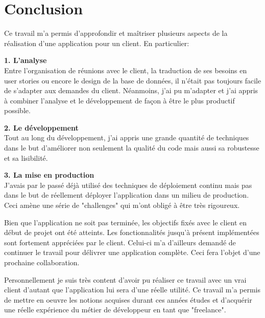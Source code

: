 \section{Conclusion}

Ce travail m'a permis d'approfondir et maîtriser plusieurs aspects de la réalisation d'une application pour un client. En particulier:

\vskip 0.5cm

\textbf{1. L'analyse} \\Entre l'organisation de réunions avec le client, la traduction de ses besoins en user stories ou encore le design de la base de données, il n'était pas toujours facile de s'adapter aux demandes du client. Néanmoins, j'ai pu m'adapter et j'ai appris à combiner l'analyse et le développement de façon à être le plus productif possible. 

\vskip 0.5cm
\textbf{2. Le développement} \\Tout au long du développement, j'ai appris une grande quantité de techniques dans le but d'améliorer non seulement la qualité du code mais aussi sa robustesse et sa lisibilité. 

\vskip 0.5cm
\textbf{3. La mise en production} \\J'avais par le passé déjà utilisé des techniques de déploiement continu mais pas dans le but de réellement déployer l'application dans un milieu de production. Ceci amène une série de "challenges" qui m'ont obligé à être très rigoureux. 

\newpara

Bien que l'application ne soit pas terminée, les objectifs fixés avec le client en début de projet ont été atteints. Les fonctionnalités jusqu'à présent implémentées sont fortement appréciées par le client. Celui-ci m'a d'ailleurs demandé de continuer le travail pour délivrer une application complète. Ceci fera l'objet d'une prochaine collaboration. 

\newpara

Personnellement je suis très content d'avoir pu réaliser ce travail avec un vrai client d'autant que l'application lui sera d'une réelle utilité. Ce travail m'a permis de mettre en oeuvre les notions acquises durant ces années études et d'acquérir une réelle expérience du métier de développeur en tant que "freelance". 